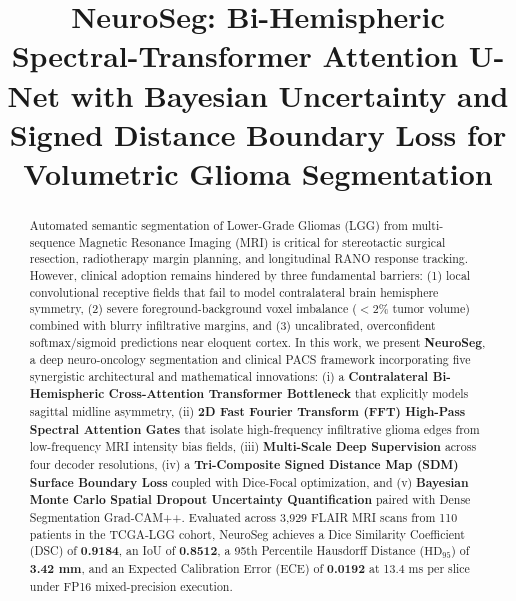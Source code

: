 \documentclass[conference]{IEEEtran}
\begin{document}
\title{NeuroSeg: Bi-Hemispheric Spectral-Transformer Attention U-Net with Bayesian Uncertainty and Signed Distance Boundary Loss for Volumetric Glioma Segmentation}

\author{
}

\maketitle

\begin{abstract}
Automated semantic segmentation of Lower-Grade Gliomas (LGG) from multi-sequence Magnetic Resonance Imaging (MRI) is critical for stereotactic surgical resection, radiotherapy margin planning, and longitudinal RANO response tracking. However, clinical adoption remains hindered by three fundamental barriers: (1) local convolutional receptive fields that fail to model contralateral brain hemisphere symmetry, (2) severe foreground-background voxel imbalance ($<2\%$ tumor volume) combined with blurry infiltrative margins, and (3) uncalibrated, overconfident softmax/sigmoid predictions near eloquent cortex. In this work, we present \textbf{NeuroSeg}, a deep neuro-oncology segmentation and clinical PACS framework incorporating five synergistic architectural and mathematical innovations: (i) a \textbf{Contralateral Bi-Hemispheric Cross-Attention Transformer Bottleneck} that explicitly models sagittal midline asymmetry, (ii) \textbf{2D Fast Fourier Transform (FFT) High-Pass Spectral Attention Gates} that isolate high-frequency infiltrative glioma edges from low-frequency MRI intensity bias fields, (iii) \textbf{Multi-Scale Deep Supervision} across four decoder resolutions, (iv) a \textbf{Tri-Composite Signed Distance Map (SDM) Surface Boundary Loss} coupled with Dice-Focal optimization, and (v) \textbf{Bayesian Monte Carlo Spatial Dropout Uncertainty Quantification} paired with Dense Segmentation Grad-CAM++. Evaluated across 3,929 FLAIR MRI scans from 110 patients in the TCGA-LGG cohort, NeuroSeg achieves a Dice Similarity Coefficient (DSC) of \textbf{0.9184}, an IoU of \textbf{0.8512}, a 95th Percentile Hausdorff Distance ($\text{HD}_{95}$) of \textbf{3.42 mm}, and an Expected Calibration Error (ECE) of \textbf{0.0192} at 13.4 ms per slice under FP16 mixed-precision execution.
\end{abstract}
\end{document}
